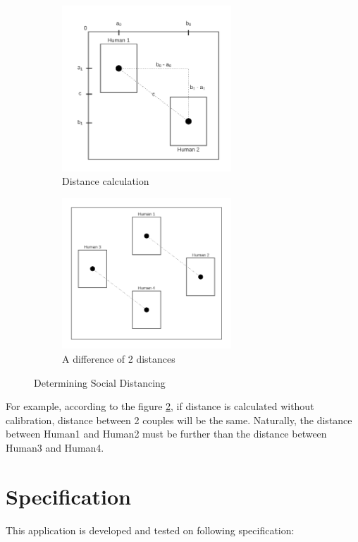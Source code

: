         \begin{figure}[h!]
            \centering
            \begin{subfigure}{.5\textwidth}
              \centering
              \includegraphics[width=2.5in]{images/chapter2/distance.png}
              \caption{Distance calculation}
              \label{distanceCalculation}
            \end{subfigure}%
            \begin{subfigure}{.5\textwidth}
              \centering
              \includegraphics[width=2.5in]{images/chapter2/two-distances.png}
              \caption{A difference of 2 distances}
              \label{twoDistances}
            \end{subfigure}
            \caption{Determining Social Distancing}
            \label{determiningConcept}
        \end{figure}

        For example, according to the figure \ref{twoDistances},
        if distance is calculated without calibration, distance between 2 couples will be the same.
        Naturally, the distance between Human1 and Human2 must be further than the distance between Human3 and Human4.

    \section{Specification}
        This application is developed and tested on following specification:

